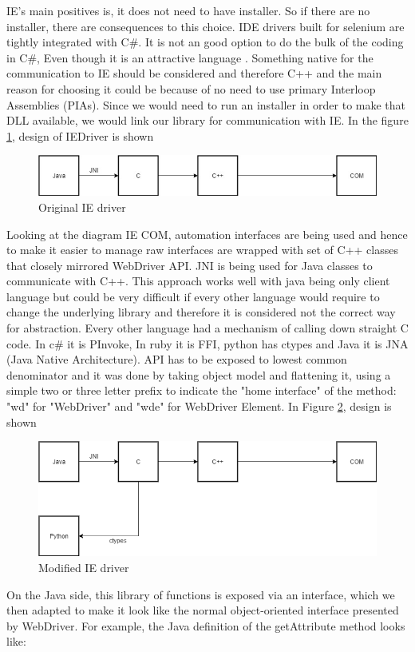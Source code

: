 \documentclass[article,type=msc,colorback,accentcolor=tud9c,twoside,11pt]{tudthesis}
\begin{document}
	IE's main positives is, it does not need to have installer. So if there are no installer, there are consequences to this choice. IDE drivers built for selenium are tightly integrated with C\#. It is not an good option to do the bulk of the coding in C\#, Even though it is an attractive language . Something native for the communication to IE should be considered and therefore C++ and the main reason for choosing it could be because of no need to use primary Interloop Assemblies (PIAs). Since we would need to run an installer in order to make that DLL available, we would link our library for communication with IE. In the figure  \ref{fig:OriginalIEdriver}, design of IEDriver is shown 
	\begin{figure}[h]
		\centering
		\includegraphics[scale=0.6]{OriginalIEdriver}
		\caption{Original IE driver}
		\label{fig:OriginalIEdriver}
	\end{figure}
	Looking at the diagram IE COM, automation interfaces are being used and hence to make it easier to manage raw interfaces are wrapped with set of C++ classes that closely mirrored WebDriver API. JNI is being used for Java classes to communicate with C++. This approach works well with java being only client language but could be very difficult if every other language would require to change the underlying library and therefore it is considered not the correct way for abstraction. Every other language had a mechanism of calling down straight C code. In c\# it is PInvoke, In ruby it is FFI, python has ctypes and Java it is JNA (Java Native Architecture). API has to be exposed to lowest common denominator and it was done by taking object model and flattening it, using a simple two or three letter prefix to indicate the "home interface" of the method: "wd" for "WebDriver" and "wde" for WebDriver Element. In Figure 
	\ref{fig:ModifiedIEdriver}, design is shown 
	\begin{figure}[h]
		\centering
		\includegraphics[scale=0.6]{ModifiedIEdriver.PNG}
		\caption{Modified IE driver}
		\label{fig:ModifiedIEdriver}
	\end{figure}
	On the Java side, this library of functions is exposed via an interface, which we then adapted to make it look like the normal object-oriented interface presented by WebDriver. For example, the Java definition of the getAttribute method looks like:
	
\end{document}
